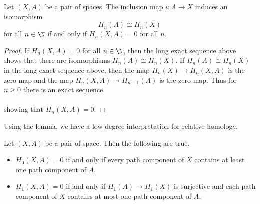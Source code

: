 \documentclass[a4paper]{article}
\begin{document}
\begin{lmm}{}{} Let $(X,A)$ be a pair of spaces. The inclusion map $\iota:A\to X$ induces an isomorphism $$H_n(A)\cong H_n(X)$$ for all $n\in\N$ if and only if $H_n(X,A)=0$ for all $n$. 
\begin{proof}
If $H_n(X,A)=0$ for all $n\in\N$, then the long exact sequence above shows that there are isomorphisms $H_n(A)\cong H_n(X)$. If $H_n(A)\cong H_n(X)$ in the long exact sequence above, then the map $H_n(X)\to H_n(X,A)$ is the zero map and the map $H_n(X,A)\to H_{n-1}(A)$ is the zero map. Thus for $n\geq 0$ there is an exact sequence \\
\\
showing that $H_n(X,A)=0$. 
\end{proof}
\end{lmm}

Using the lemma, we have a low degree interpretation for relative homology. 

\begin{prp}{}{} Let $(X,A)$ be a pair of space. Then the following are true. 
\begin{itemize}
\item $H_0(X,A)=0$ if and only if every path component of $X$ contains at least one path component of $A$. 
\item $H_1(X,A)=0$ if and only if $H_1(A)\to H_1(X)$ is surjective and each path component of $X$ contains at most one path-component of $A$. 
\end{itemize}
\end{prp}
\end{document}
